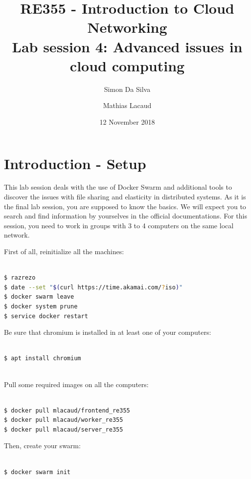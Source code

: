 \documentclass[a4paper,11pt]{exam}
\date{12 November 2018}
\title{RE355 - Introduction to Cloud Networking\\
Lab session 4: Advanced issues in cloud computing}
\author{Simon Da Silva \and Mathias Lacaud}
\begin{document}
\maketitle

\section{Introduction - Setup}

This lab session deals with the use of Docker Swarm and additional tools to discover the issues with file sharing and elasticity in distributed systems. 
As it is the final lab session, you are supposed to know the basics.
We will expect you to search and find information by yourselves in the official documentations.
For this session, you need to work in groups with 3 to 4 computers on the same local network.

First of all, reinitialize all the machines:

\begin{lstlisting}[frame=single,language={sh}]  % Start your code-block

$ razrezo
$ date --set "$(curl https://time.akamai.com/?iso)"
$ docker swarm leave
$ docker system prune
$ service docker restart 

\end{lstlisting}

Be sure that chromium is installed in at least one of your computers: 

\begin{lstlisting}[frame=single,language={sh}]  % Start your code-block

$ apt install chromium
	
\end{lstlisting}

Pull some required images on all the computers:

\begin{lstlisting}[frame=single,language={sh}]  % Start your code-block

$ docker pull mlacaud/frontend_re355 
$ docker pull mlacaud/worker_re355 
$ docker pull mlacaud/server_re355

\end{lstlisting}

Then, create your swarm: 

\begin{lstlisting}[frame=single,language={sh}]  % Start your code-block

$ docker swarm init

\end{lstlisting}
\end{document}
